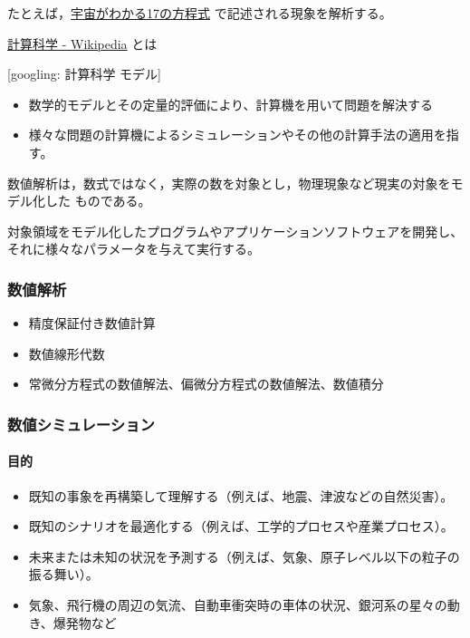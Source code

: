 \documentclass[dvipdfmx,11pat]{jarticle}
\begin{document}
たとえば，\href{./topics/宇宙がわかる17の方程式.org}{宇宙がわかる17の方程式} で記述される現象を解析する。

\href{https://ja.wikipedia.org/wiki/\%E8\%A8\%88\%E7\%AE\%97\%E7\%A7\%91\%E5\%AD\%A6}{計算科学 - Wikipedia} とは

{[}googling: 計算科学 モデル] 
\begin{itemize}
\item 数学的モデルとその定量的評価により、計算機を用いて問題を解決する
\item 様々な問題の計算機によるシミュレーションやその他の計算手法の適用を指
す。
\end{itemize}

数値解析は，数式ではなく，実際の数を対象とし，物理現象など現実の対象をモデル化した
ものである。

対象領域をモデル化したプログラムやアプリケーションソフトウェアを開発し、
それに様々なパラメータを与えて実行する。
\subsubsection{数値解析}
\label{sec:orgfcd517b}
\begin{itemize}
\item 精度保証付き数値計算
\item 数値線形代数
\item 常微分方程式の数値解法、偏微分方程式の数値解法、数値積分
\end{itemize}
\subsubsection{数値シミュレーション}
\label{sec:orgd3e85a5}
\paragraph{目的}
\label{sec:orgacde37d}
\begin{itemize}
\item 既知の事象を再構築して理解する（例えば、地震、津波などの自然災害）。
\item 既知のシナリオを最適化する（例えば、工学的プロセスや産業プロセス）。
\item 未来または未知の状況を予測する（例えば、気象、原子レベル以下の粒子の振る舞い）。
\item 気象、飛行機の周辺の気流、自動車衝突時の車体の状況、銀河系の星々の動き、爆発物など
\end{itemize}
\end{document}
